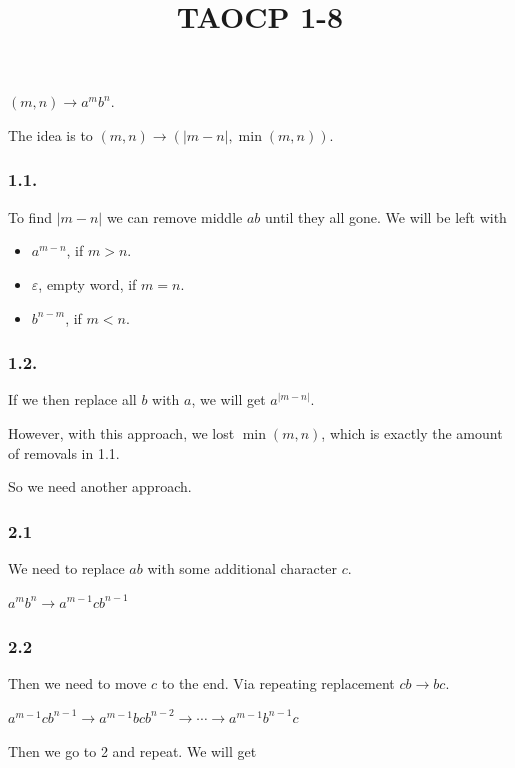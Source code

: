 \documentclass{article}
\title{TAOCP 1\mbox{-}8}
\begin{document}
\maketitle

\( (m, n) \to a^{m}b^{n} \).

The idea is to \( (m, n) \to (|m - n|, \min(m, n)) \).

\subsubsection*{1.1.}

To find \( | m - n | \) we can remove middle \( ab \) until they all gone. We will be left with

\begin{itemize}
\item \( a^{m-n} \), if \( m > n \).
\item \( \varepsilon \), empty word, if \( m = n \).
\item \( b^{n-m} \), if \( m < n \).
\end{itemize}

\subsubsection*{1.2.}

If we then replace all \( b \) with \( a \), we will get \( a^{|m-n|} \).

However, with this approach, we lost \( \min(m, n) \), which is exactly the amount of removals in 1.1.

So we need another approach.

\subsubsection*{2.1}

We need to replace \( ab \) with some additional character \( c \).

\( a^{m}b^{n} \to a^{m-1}cb^{n-1} \)

\subsubsection*{2.2}

Then we need to move \( c \) to the end. Via repeating replacement \( cb \to bc \).

\( a^{m-1}cb^{n-1} \to a^{m-1}bcb^{n-2} \to \cdots \to a^{m-1}b^{n-1}c \)

Then we go to 2 and repeat. We will get
\end{document}
